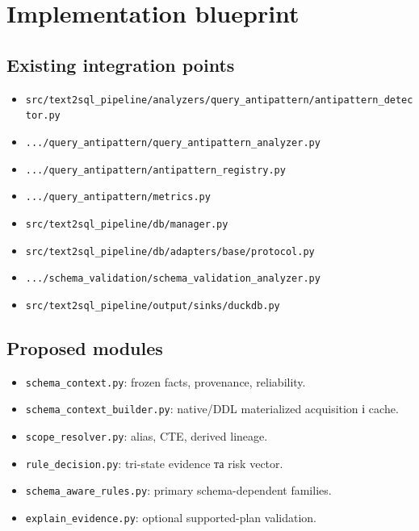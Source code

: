 \documentclass[11pt,a4paper]{article}
\begin{document}
\section{Implementation blueprint}

\subsection{Existing integration points}

\begin{itemize}
\item \texttt{src/text2sql\_pipeline/analyzers/query\_antipattern/antipattern\_detector.py}
\item \texttt{.../query\_antipattern/query\_antipattern\_analyzer.py}
\item \texttt{.../query\_antipattern/antipattern\_registry.py}
\item \texttt{.../query\_antipattern/metrics.py}
\item \texttt{src/text2sql\_pipeline/db/manager.py}
\item \texttt{src/text2sql\_pipeline/db/adapters/base/protocol.py}
\item \texttt{.../schema\_validation/schema\_validation\_analyzer.py}
\item \texttt{src/text2sql\_pipeline/output/sinks/duckdb.py}
\end{itemize}

\subsection{Proposed modules}

\begin{itemize}
\item \texttt{schema\_context.py}: frozen facts, provenance, reliability.
\item \texttt{schema\_context\_builder.py}: native/DDL materialized acquisition і cache.
\item \texttt{scope\_resolver.py}: alias, CTE, derived lineage.
\item \texttt{rule\_decision.py}: tri-state evidence та risk vector.
\item \texttt{schema\_aware\_rules.py}: primary schema-dependent families.
\item \texttt{explain\_evidence.py}: optional supported-plan validation.
\end{itemize}
\end{document}
